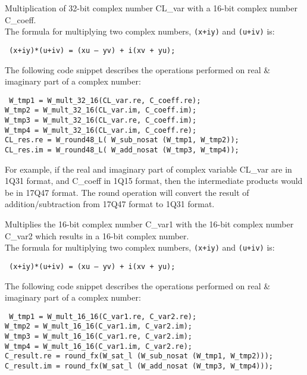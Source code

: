 Multiplication of 32-bit complex number CL\_var with a 16-bit complex number C\_coeff.\\
The formula for multiplying two complex numbers, {\tt (x+iy)} and {\tt (u+iv)} is:

{\tt {} (x+iy)*(u+iv) = (xu – yv) + i(xv + yu);}

The following code snippet describes the operations performed on real \& imaginary part of a complex number:

{\tt {} W\_tmp1 = W\_mult\_32\_16(CL\_var.re, C\_coeff.re);\\
 W\_tmp2 = W\_mult\_32\_16(CL\_var.im, C\_coeff.im);\\
 W\_tmp3 = W\_mult\_32\_16(CL\_var.re, C\_coeff.im);\\
 W\_tmp4 = W\_mult\_32\_16(CL\_var.im, C\_coeff.re);\\

 CL\_res.re = W\_round48\_L( W\_sub\_nosat (W\_tmp1, W\_tmp2));\\
 CL\_res.im = W\_round48\_L( W\_add\_nosat (W\_tmp3, W\_tmp4));
}

For example, if the real and imaginary part of complex variable CL\_var are in 1Q31 format, and C\_coeff in 1Q15 format, then the intermediate products would be in 17Q47 format.
The round operation will convert the result of addition/subtraction from 17Q47 format to 1Q31 format.


Multiplies the 16-bit complex number C\_var1 with the 16-bit complex number C\_var2 which results in a 16-bit complex number.\\
The formula for multiplying two complex numbers, {\tt (x+iy)} and {\tt (u+iv)} is:

{\tt {} (x+iy)*(u+iv) = (xu – yv) + i(xv + yu);}

The following code snippet describes the operations performed on real \& imaginary part of a complex number:

{\tt {} W\_tmp1 = W\_mult\_16\_16(C\_var1.re, C\_var2.re);\\
 W\_tmp2 = W\_mult\_16\_16(C\_var1.im, C\_var2.im);\\
 W\_tmp3 = W\_mult\_16\_16(C\_var1.re, C\_var2.im);\\
 W\_tmp4 = W\_mult\_16\_16(C\_var1.im, C\_var2.re);\\

 C\_result.re = round\_fx(W\_sat\_l (W\_sub\_nosat (W\_tmp1, W\_tmp2)));\\
 C\_result.im = round\_fx(W\_sat\_l (W\_add\_nosat (W\_tmp3, W\_tmp4)));
}

